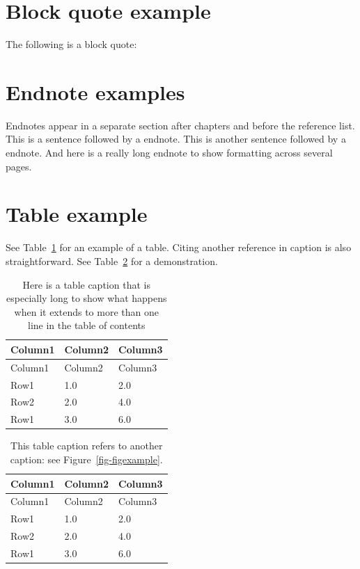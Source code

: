 \documentclass[letterpaper,             %
               oneside,                 %
               \pointsize]              %
               {memoir}
\begin{document}
\hypertarget{block-quote-example}{%
\section{Block quote example}\label{block-quote-example}}

The following is a block quote:

\hypertarget{endnote-examples}{%
\section{Endnote examples}\label{endnote-examples}}

Endnotes appear in a separate section after chapters and before the
reference list. This is a sentence followed by a endnote. This is
another sentence followed by a endnote. And here is a really long
endnote to show formatting across several pages.

\hypertarget{table-example}{%
\section{Table example}\label{table-example}}

See Table~\ref{tbl-table1} for an example of a table. Citing another
reference in caption is also straightforward. See Table~\ref{tbl-table2}
for a demonstration.

\hypertarget{tbl-table1}{}
\begin{longtable}[]{@{}lll@{}}
\caption{\label{tbl-table1}Here is a table caption that is especially
long to show what happens when it extends to more than one line in the
table of contents}\tabularnewline
\toprule\noalign{}
Column1 & Column2 & Column3 \\
\midrule\noalign{}
\endfirsthead
\toprule\noalign{}
Column1 & Column2 & Column3 \\
\midrule\noalign{}
\endhead
\bottomrule\noalign{}
\endlastfoot
Row1 & 1.0 & 2.0 \\
Row2 & 2.0 & 4.0 \\
Row1 & 3.0 & 6.0 \\
\end{longtable}

\hypertarget{tbl-table2}{}
\begin{longtable}[]{@{}lll@{}}
\caption{\label{tbl-table2}This table caption refers to another caption:
see Figure~\ref{fig-figexample}.}\tabularnewline
\toprule\noalign{}
Column1 & Column2 & Column3 \\
\midrule\noalign{}
\endfirsthead
\toprule\noalign{}
Column1 & Column2 & Column3 \\
\midrule\noalign{}
\endhead
\bottomrule\noalign{}
\endlastfoot
Row1 & 1.0 & 2.0 \\
Row2 & 2.0 & 4.0 \\
Row1 & 3.0 & 6.0 \\
\end{longtable}
\end{document}
